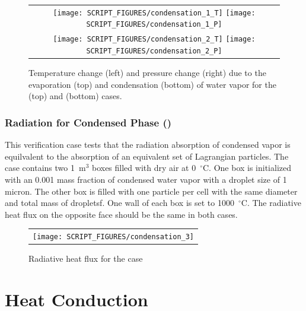 \documentclass[11pt]{book}
\begin{document}
\begin{figure}[ht]
	\centering
	\begin{tabular}{c}
		\texttt{[image: SCRIPT\_FIGURES/condensation\_1\_T]}
		\texttt{[image: SCRIPT\_FIGURES/condensation\_1\_P]} \\
		\texttt{[image: SCRIPT\_FIGURES/condensation\_2\_T]}
		\texttt{[image: SCRIPT\_FIGURES/condensation\_2\_P]}
	\end{tabular}
	\caption[Results of the  (top) and  (bottom) cases]{Temperature change (left) and pressure change (right) due to the evaporation (top) and condensation (bottom) of water vapor for the  (top) and  (bottom) cases.}
	\label{fig:condensation_gas}
\end{figure}

\subsection{Radiation for Condensed Phase (\texorpdfstring{} {condensation\_3})}
\label{condensation_radiation}
This verification case tests that the radiation absorption of condensed vapor is equilvalent to the absorption of an equivalent set of Lagrangian particles. The case contains two 1~m$^3$ boxes filled with dry air at 0~$^\circ$C. One box is initialized with an 0.001 mass fraction of condensed water vapor with a droplet size of 1 micron. The other box is filled with one particle per cell with the same diameter and total mass of dropletsf. One wall of each box is set to 1000~$^\circ$C. The radiative heat flux on the opposite face should be the same in both cases.

\begin{figure}[ht]
\centering
\begin{tabular}{c}
\texttt{[image: SCRIPT\_FIGURES/condensation\_3]}
\end{tabular}
\caption[Radiative heat flux for the  case]{Radiative heat flux for the  case}
\label{fig:condensation_3}
\end{figure}

\chapter{Heat Conduction}
\end{document}

